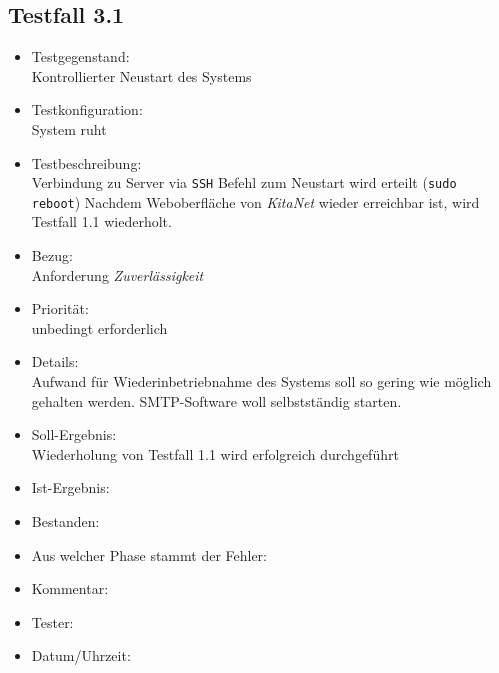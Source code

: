\subsection{Testfall 3.1}
\begin{itemize}
	\item Testgegenstand:\\
Kontrollierter Neustart des Systems
	\item Testkonfiguration:\\
	System ruht
	\item Testbeschreibung:\\
	Verbindung zu Server via \verb+SSH+
	Befehl zum Neustart wird erteilt (\verb+sudo reboot+)
	Nachdem Weboberfläche von \textit{KitaNet} wieder erreichbar ist, wird Testfall 1.1 wiederholt.
	\item Bezug:\\
	Anforderung \textit{Zuverlässigkeit}
	\item Priorität:\\
	unbedingt erforderlich
	\item Details:\\
	Aufwand für Wiederinbetriebnahme des Systems soll so gering wie möglich gehalten werden. SMTP-Software woll selbstständig starten.
	\item Soll-Ergebnis:\\
	Wiederholung von Testfall 1.1 wird erfolgreich durchgeführt
	\item Ist-Ergebnis:\\
	\item Bestanden:\\
	\item Aus welcher Phase stammt der Fehler:\\
	\item Kommentar:\\
	\item Tester:\\
	\item Datum/Uhrzeit:\\
\end{itemize}

